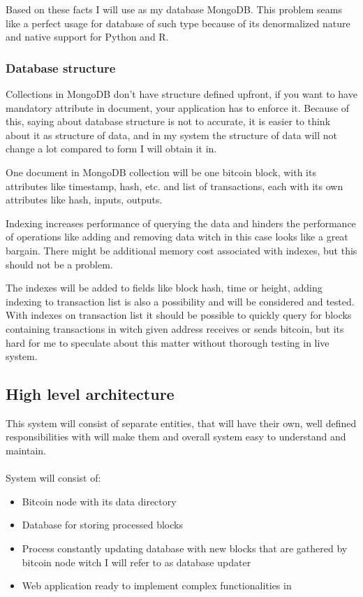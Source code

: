 \documentclass[12pt, en, eng]{mgr}
\begin{document}
Based on these facts I will use as my database MongoDB. This problem seams like a perfect usage for database of such type because of its denormalized nature and native support for Python and R.


\subsubsection{Database structure}
 
Collections in MongoDB don't have structure defined upfront, if you want to have mandatory attribute in document, your application has to enforce it. Because of this, saying about database structure is not to accurate, it is easier to think about it as structure of data, and in my system the structure of data will not change a lot compared to form I will obtain it in. 

One document in MongoDB collection will be one bitcoin block, with its attributes like timestamp, hash, etc. and list of transactions, each with its own attributes like hash, inputs, outputs.

 
Indexing increases performance of querying the data and hinders the performance of operations like adding and removing data witch in this case looks like a great bargain. There might be additional memory cost associated with indexes, but this should not be a problem.

The indexes will be added to fields like block hash, time or height, adding indexing to transaction list is also a possibility and will be considered and tested. With indexes on transaction list it should be possible to quickly query for blocks containing transactions in witch given address receives or sends bitcoin, but its hard for me to speculate about this matter without thorough testing in live system.

\subsection{High level architecture}
This system will consist of separate entities, that will have their own, well defined responsibilities with will make them and overall system easy to understand and maintain.
\\
\\
System will consist of:
\begin{itemize}
\item
Bitcoin node with its data directory
\item
Database for storing processed blocks
\item
Process constantly updating database with new blocks that are gathered by bitcoin node witch I will refer to as database updater
\item
Web application ready to implement complex functionalities in
\end{itemize}
\end{document}

